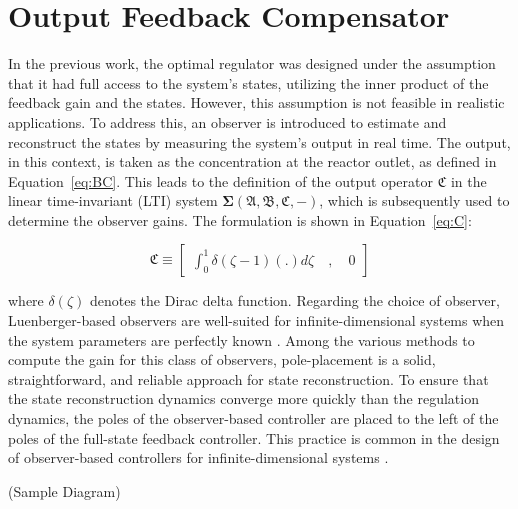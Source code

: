 \section{Output Feedback Compensator}

In the previous work, the optimal regulator was designed under the assumption that it had full access to the system's states, utilizing the inner product of the feedback gain and the states. However, this assumption is not feasible in realistic applications. To address this, an observer is introduced to estimate and reconstruct the states by measuring the system's output in real time. The output, in this context, is taken as the concentration at the reactor outlet, as defined in Equation~\ref{eq:BC}. This leads to the definition of the output operator $\mathfrak{C}$ in the linear time-invariant (LTI) system $\mathbf{\Sigma(\mathfrak{A},\mathfrak{B},\mathfrak{C},-)}$, which is subsequently used to determine the observer gains. The formulation is shown in Equation~\ref{eq:C}:

\begin{equation} \label{eq:C}
    \mathfrak{C} \equiv \begin{bmatrix}
        \int_0^1 \delta(\zeta-1) (.) d\zeta \quad , \quad 0
    \end{bmatrix}
\end{equation}

where $\delta(\zeta)$ denotes the Dirac delta function. Regarding the choice of observer, Luenberger-based observers are well-suited for infinite-dimensional systems when the system parameters are perfectly known \autocite{ali2015reviewobserver}. Among the various methods to compute the gain for this class of observers, pole-placement is a solid, straightforward, and reliable approach for state reconstruction. To ensure that the state reconstruction dynamics converge more quickly than the regulation dynamics, the poles of the observer-based controller are placed to the left of the poles of the full-state feedback controller. This practice is common in the design of observer-based controllers for infinite-dimensional systems \autocite{morrisbook}.

(Sample Diagram)

